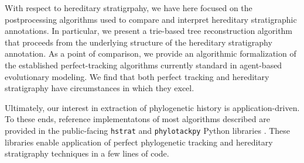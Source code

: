With respect to hereditary stratigrpahy, we have here focused on the postprocessing algorithms used to compare and interpret hereditary stratigraphic annotations.
In particular, we present a trie-based tree reconstruction algorithm that proceeds from the underlying structure of the hereditary stratigraphy annotation.
As a point of comparison, we provide an algorithmic formalization of the established perfect-tracking algorithms currently standard in agent-based evolutionary modeling.
We find that both perfect tracking and hereditary stratigraphy have circumstances in which they excel.


Ultimately, our interest in extraction of phylogenetic history is application-driven.
To these ends, reference implementatons of most algorithms described are provided in the public-facing \texttt{hstrat} and \texttt{phylotackpy} Python libraries \citep{moreno2022hstrat, dolson2023phylotrackpy}.
These libraries enable application of perfect phylogenetic tracking and hereditary stratigraphy techniques in a few lines of code.
